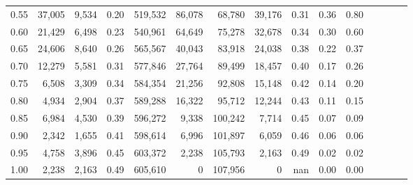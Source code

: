 \begin{tabular}{rrrcrrrrrrrrrrr}
0.55 &  37,005 &   9,534 &                                       0.20 &  519,532 &   86,078 &   68,780 &   39,176 &  0.31 &  0.36 &                         0.80 \\
0.60 &  21,429 &   6,498 &                                       0.23 &  540,961 &   64,649 &   75,278 &   32,678 &  0.34 &  0.30 &                         0.60 \\
0.65 &  24,606 &   8,640 &                                       0.26 &  565,567 &   40,043 &   83,918 &   24,038 &  0.38 &  0.22 &                         0.37 \\
0.70 &  12,279 &   5,581 &                                       0.31 &  577,846 &   27,764 &   89,499 &   18,457 &  0.40 &  0.17 &                         0.26 \\
0.75 &   6,508 &   3,309 &                                       0.34 &  584,354 &   21,256 &   92,808 &   15,148 &  0.42 &  0.14 &                         0.20 \\
0.80 &   4,934 &   2,904 &                                       0.37 &  589,288 &   16,322 &   95,712 &   12,244 &  0.43 &  0.11 &                         0.15 \\
0.85 &   6,984 &   4,530 &                                       0.39 &  596,272 &    9,338 &  100,242 &    7,714 &  0.45 &  0.07 &                         0.09 \\
0.90 &   2,342 &   1,655 &                                       0.41 &  598,614 &    6,996 &  101,897 &    6,059 &  0.46 &  0.06 &                         0.06 \\
0.95 &   4,758 &   3,896 &                                       0.45 &  603,372 &    2,238 &  105,793 &    2,163 &  0.49 &  0.02 &                         0.02 \\
1.00 &   2,238 &   2,163 &                                       0.49 &  605,610 &        0 &  107,956 &        0 &   nan &  0.00 &                         0.00 \\
\bottomrule
\end{tabular}

